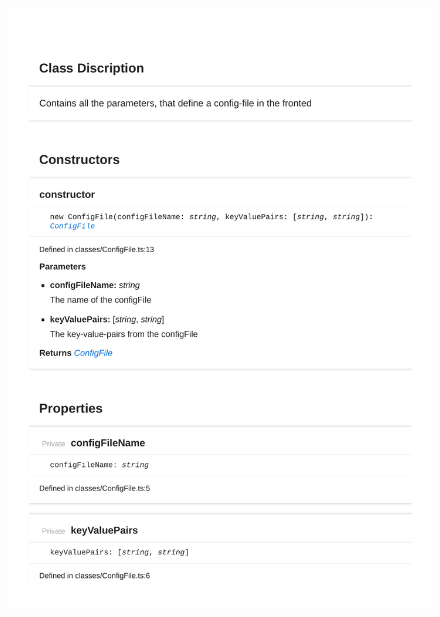\begin{figure}[H]
\centerline{\includegraphics[width=\textwidth]{FrontendDocsAsPDF/Classes/ConfigFile.pdf}}
\end{figure}

